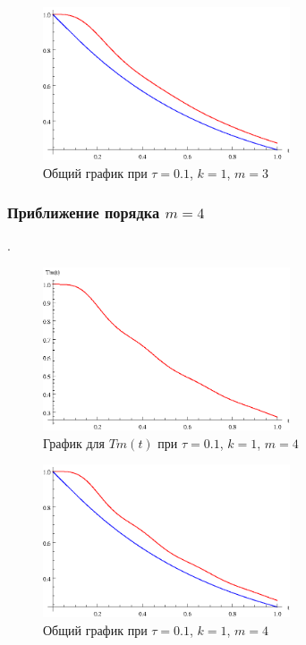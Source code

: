 \begin{figure}[h]
\begin{center}
\includegraphics[width=0.65\textwidth]{./3_results/1_7.eps}
\end{center}
\caption{Общий график при $\tau=0.1$, $k=1$, $m=3$}
\end{figure}

\newpage

\subsubsection{Приближение порядка $m=4$}.

\begin{figure}[h]
\begin{center}
\includegraphics[width=0.65\textwidth]{./3_results/1_8.eps}
\end{center}
\caption{График для $Tm(t)$ при $\tau=0.1$, $k=1$, $m=4$}
\end{figure}

\begin{figure}[h]
\begin{center}
\includegraphics[width=0.65\textwidth]{./3_results/1_9.eps}
\end{center}
\caption{Общий график при $\tau=0.1$, $k=1$, $m=4$}
\end{figure}

